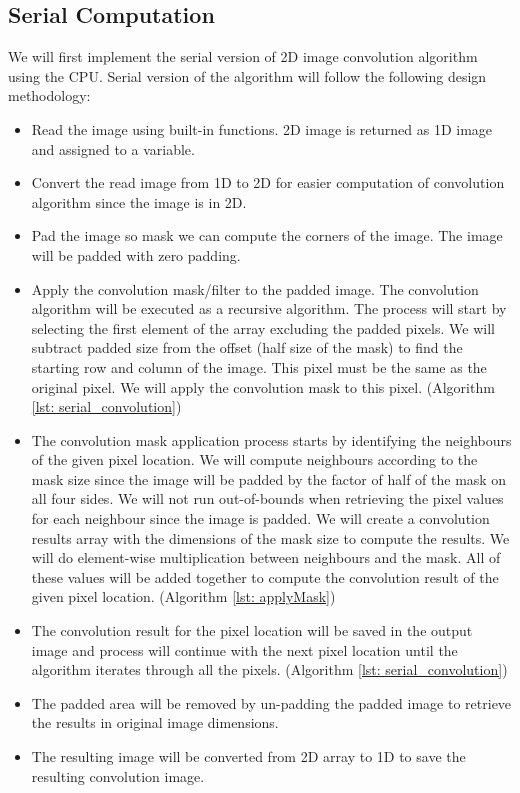 \subsection{Serial Computation}
We will first implement the serial version of 2D image convolution algorithm using the CPU. Serial version of the algorithm will follow the following design methodology:
\begin{itemize}[leftmargin=0em]
  \setlength{\itemsep}{0pt}
  \item Read the image using built-in functions. 2D image is returned as 1D image and assigned to a variable.
  \item Convert the read image from 1D to 2D for easier computation of convolution algorithm since the image is in 2D.
  \item Pad the image so mask we can compute the corners of the image. The image will be padded with zero padding. 
  \item Apply the convolution mask/filter to the padded image. The convolution algorithm will be executed as a recursive algorithm. The process will start by selecting the first element of the array excluding the padded pixels. We will subtract padded size from the offset (half size of the mask) to find the starting row and column of the image. This pixel must be the same as the original pixel. We will apply the convolution mask to this pixel. (Algorithm \ref{lst: serial_convolution})
  \item The convolution mask application process starts by identifying the neighbours of the given pixel location. We will compute neighbours according to the mask size since the image will be padded by the factor of half of the mask on all four sides. We will not run out-of-bounds when retrieving the pixel values for each neighbour since the image is padded. We will create a convolution results array with the dimensions of the mask size to compute the results. We will do element-wise multiplication between neighbours and the mask. All of these values will be added together to compute the convolution result of the given pixel location. (Algorithm \ref{lst: applyMask})
  \item The convolution result for the pixel location will be saved in the output image and process will continue with the next pixel location until the algorithm iterates through all the pixels. (Algorithm \ref{lst: serial_convolution})
  \item The padded area will be removed by un-padding the padded image to retrieve the results in original image dimensions.
  \item The resulting image will be converted from 2D array to 1D to save the resulting convolution image. 
\end{itemize}

